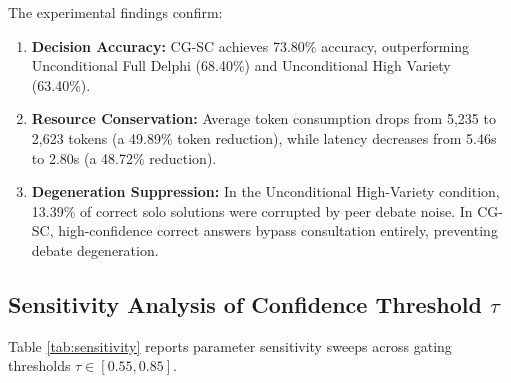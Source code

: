 \documentclass[conference]{IEEEtran}
\begin{document}
\begin{table}[htbp]
\caption{Comparative Evaluation Across 500 Decision Episodes}
\label{tab:synthetic_results}
\centering
\setlength{\tabcolsep}{3.5pt}
\end{table}

The experimental findings confirm:
\begin{enumerate}
    \item \textbf{Decision Accuracy:} CG-SC achieves 73.80\% accuracy, outperforming Unconditional Full Delphi (68.40\%) and Unconditional High Variety (63.40\%).
    \item \textbf{Resource Conservation:} Average token consumption drops from 5,235 to 2,623 tokens (a 49.89\% token reduction), while latency decreases from 5.46s to 2.80s (a 48.72\% reduction).
    \item \textbf{Degeneration Suppression:} In the Unconditional High-Variety condition, 13.39\% of correct solo solutions were corrupted by peer debate noise. In CG-SC, high-confidence correct answers bypass consultation entirely, preventing debate degeneration.
\end{enumerate}

\subsection{Sensitivity Analysis of Confidence Threshold $\tau$}
Table \ref{tab:sensitivity} reports parameter sensitivity sweeps across gating thresholds $\tau \in [0.55, 0.85]$.
\end{document}
